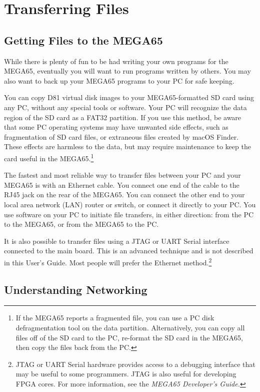 \chapter{Transferring Files}

\section{Getting Files to the MEGA65}
\label{cha:transferring-files}

While there is plenty of fun to be had writing your own programs for the MEGA65, eventually you will want to run programs written by others. You may also want to back up your MEGA65 programs to your PC for safe keeping.

You can copy D81 virtual disk images to your MEGA65-formatted SD card using any PC, without any special tools or software. Your PC will recognize the data region of the SD card as a FAT32 partition. If you use this method, be aware that some PC operating systems may have unwanted side effects, such as fragmentation of SD card files, or extraneous files created by macOS Finder. These effects are harmless to the data, but may require maintenance to keep the card useful in the MEGA65.\footnote{If the MEGA65 reports a fragmented file, you can use a PC disk defragmentation tool on the data partition. Alternatively, you can copy all files off of the SD card to the PC, re-format the SD card in the MEGA65, then copy the files back from the PC.}

The fastest and most reliable way to transfer files between your PC and your MEGA65 is with an Ethernet cable. You connect one end of the cable to the RJ45 jack on the rear of the MEGA65. You can connect the other end to your local area network (LAN) router or switch, or connect it directly to your PC. You use software on your PC to initiate file transfers, in either direction: from the PC to the MEGA65, or from the MEGA65 to the PC.

It is also possible to transfer files using a JTAG or UART Serial interface connected to the main board. This is an advanced technique and is not described in this User's Guide. Most people will prefer the Ethernet method.\footnote{JTAG or UART Serial hardware provides access to a debugging interface that may be useful to some programmers. JTAG is also useful for developing FPGA cores. For more information, see the {\it MEGA65 Developer's Guide.}}

\section{Understanding Networking}

